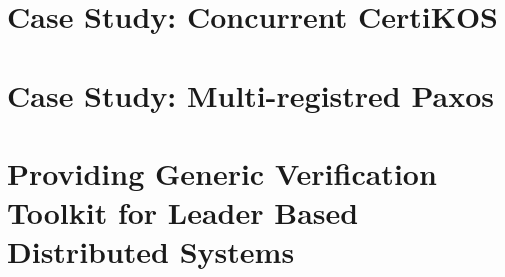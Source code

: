 \documentclass[letterpaper,11pt]{yalephd}
\begin{document}
%

%
%
%
%
%   
%   
%    



\chapter{Case Study: Concurrent CertiKOS}
\label{chapter:concurrent-certikos}

%

%    
%    



%
%
%
%
%
%
%
%


\chapter{Case Study: Multi-registred Paxos}
\label{chapter:wormspace}

%


%
%

%
%
%
%
%
%



\chapter{Providing Generic Verification Toolkit for Leader Based Distributed Systems }
\label{chapter:witness-passing}

%
%
\end{document}
